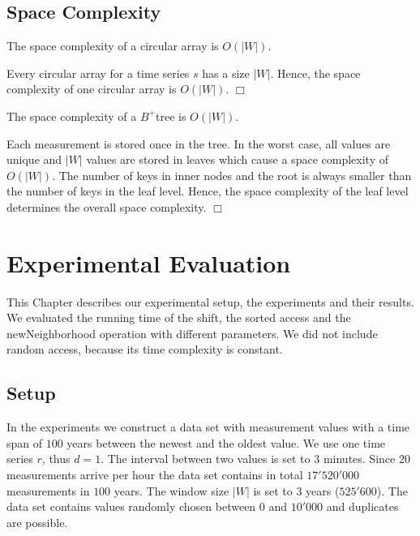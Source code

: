 \documentclass[abstracton,12pt,oneside]{scrreprt}
\newenvironment{proof}
  {\noindent{\bf Proof:\rm}}{\hfill$\Box$\vspace{\medskipamount}}
\begin{document}
\section{Space Complexity}

\begin{mydef}
	The space complexity of a circular array is $O(|W|)$.
\end{mydef}
\begin{proof}
	Every circular array for a time series $s$ has a size $|W|$. Hence, the space complexity of one circular array is $O(|W|)$.
\end{proof}


\begin{mydef}
	The space complexity of a $B^+$tree is $O(|W|)$. 
\end{mydef}
\begin{proof}
	Each measurement is stored once in the tree. In the worst case, all values are unique and $|W|$ values are stored in leaves which cause a space complexity of $O(|W|)$. The number of keys in inner nodes and the root is always smaller than the number of keys in the leaf level. Hence, the space complexity of the leaf level determines the overall space complexity.
\end{proof}

\chapter{Experimental Evaluation}
\label{sec:Experimental}
This Chapter describes our experimental setup, the experiments and their results. We evaluated the running time of the shift, the sorted access and the newNeighborhood operation with different parameters. We did not include random access, because its time complexity is constant.


\section{Setup}
\label{setup}
In the experiments we construct a data set with measurement values with a time span of $100$ years between the newest and the oldest value. We use one time series $r$, thus $d=1$. The interval between two values is set to $3$ minutes. Since 20 measurements arrive per hour the data set contains in total $17'520'000$ measurements in $100$ years. The window size $|W|$ is set to 3 years ($525'600$). The data set contains values randomly chosen between $0$ and $10'000$ and duplicates are possible.
\end{document}
